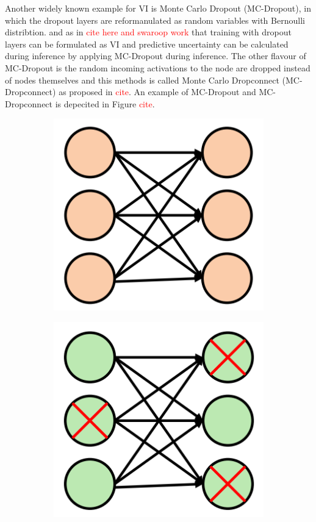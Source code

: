     Another widely known example for VI is Monte Carlo Dropout (MC-Dropout), in which the dropout layers are reformanulated as random variables with Bernoulli distribtion.
    and as in \textcolor{red}{cite here and swaroop work} that training with dropout layers can be formulated as VI and predictive uncertainty can be calculated during inference by applying MC-Dropout during inference.
    The other flavour of MC-Dropout is the random incoming activations to the node are dropped instead of nodes themselves and this methods is called Monte Carlo Dropconnect (MC-Dropconnect) as proposed in \textcolor{red}{cite}.
    An example of MC-Dropout and MC-Dropconnect is depecited in Figure \textcolor{red}{cite}.
    \begin{figure}[htbp]
        \begin{subfigure}{0.33\textwidth}
            \centering
            \includegraphics[scale=0.33]{images/BaseNW_SOTA.png}
            \caption{}
        \end{subfigure}
        \begin{subfigure}{0.33\textwidth}
            \centering
            \includegraphics[scale=0.33]{images/Dropout_SOTA.png}

\end{subfigure}
\end{figure}
